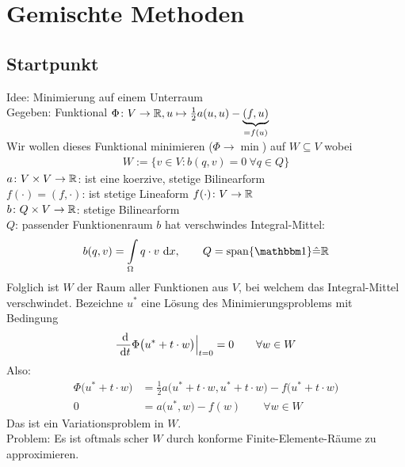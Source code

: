 \section{Gemischte Methoden}
\subsection{Startpunkt}
Idee: Minimierung auf einem Unterraum\\
Gegeben: Funktional $\Phi\colon V\to\mathbb{R},u\mapsto\frac{1}{2}a(u,u)-\underbrace{(f,u)}_{=f(u)}$\\
Wir wollen dieses Funktional minimieren ($\Phi\to\min$) auf $W\subseteq V$ wobei
\begin{align*}
	W:=\Big\lbrace v\in V:b(q,v)=0~\forall q\in Q\Big\rbrace
\end{align*}
$a\colon V\times V\to\mathbb{R}$: ist eine koerzive, stetige Bilinearform\\
$f(\cdot)=(f,\cdot)$: ist stetige Lineaform $f(\cdot)\colon V\to\mathbb{R}$ \\
$b\colon Q\times V\to\mathbb{R}$: stetige Bilinearform\\
$Q$: passender Funktionenraum\nl
$b$ hat verschwindes Integral-Mittel:
\begin{align*}
	b(q,v)=\int\limits_\Omega q\cdot v\d x,\qquad
	Q=\spann\lbrace\indi\rbrace\hat{=}\R
\end{align*}
Folglich ist $W$ der Raum aller Funktionen aus $V$, bei welchem das Integral-Mittel verschwindet.\nl
Bezeichne $u^\ast$ eine Lösung des Minimierungsproblems mit Bedingung
\begin{align*}
	\frac{\text{ d}}{\text{ d} t}\Phi\big(u^\ast+t\cdot w\big)\Big|_{t=0}=0\qquad\forall w\in W
\end{align*}
Also:
\begin{align*}
	\Phi\big(u^\ast+t\cdot w\big)
	&=\frac{1}{2}a\big(u^\ast+t\cdot w,u^\ast+t\cdot w\big)-f\big(u^\ast+t\cdot w\big)\\
	0&=a\big(u^\ast,w\big)-f(w)\qquad\forall w\in W
\end{align*}
Das ist ein Variationsproblem in $W$.\\
Problem: Es ist oftmals scher $W$ durch konforme Finite-Elemente-Räume zu approximieren.

